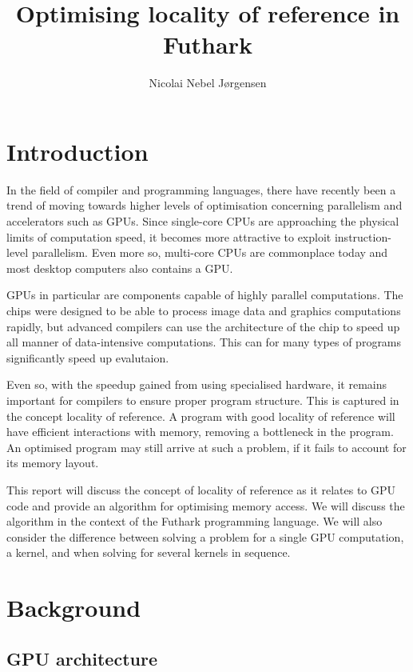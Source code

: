 \documentclass{article}
\begin{document}
\title{Optimising locality of reference in Futhark}
\author{Nicolai Nebel Jørgensen}

\maketitle

\newpage

\section{Introduction}

In the field of compiler and programming languages, there have recently been a trend of moving towards higher levels of optimisation concerning parallelism and
accelerators such as GPUs. Since single-core CPUs are approaching the physical limits of computation speed, it becomes more attractive to exploit
instruction-level parallelism. Even more so, multi-core CPUs are commonplace today and most desktop computers also contains a GPU.

GPUs in particular are components capable of highly parallel computations. The chips were designed to be able to process image data and graphics computations
rapidly, but advanced compilers can use the architecture of the chip to speed up all manner of data-intensive computations. This can for many types of programs
significantly speed up evalutaion.

Even so, with the speedup gained from using specialised hardware, it remains important for compilers to ensure proper program structure. This is captured in the
concept locality of reference. A program with good locality of reference will have efficient interactions with memory, removing a bottleneck in the program. An
optimised program may still arrive at such a problem, if it fails to account for its memory layout.

This report will discuss the concept of locality of reference as it relates to GPU code and provide an algorithm for optimising memory access. We will discuss
the algorithm in the context of the Futhark programming language.  We will also consider the difference between solving a problem for a single GPU computation,
a kernel, and when solving for several kernels in sequence.

\section{Background}

\subsection{GPU architecture}
\end{document}
